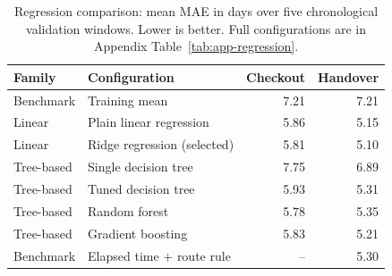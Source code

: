 \begin{table}[ht]
\centering\small
\caption{Regression comparison: mean MAE in days over five chronological validation windows. Lower is better. Full configurations are in Appendix Table~\ref{tab:app-regression}.}
\label{tab:regression-family-summary}
\begin{tabular}{@{}llrr@{}}
\toprule
Family & Configuration & Checkout & Handover \\
\midrule
Benchmark & Training mean & 7.21 & 7.21 \\
Linear & Plain linear regression & 5.86 & 5.15 \\
Linear & Ridge regression (selected) & 5.81 & 5.10 \\
Tree-based & Single decision tree & 7.75 & 6.89 \\
Tree-based & Tuned decision tree & 5.93 & 5.31 \\
Tree-based & Random forest & 5.78 & 5.35 \\
Tree-based & Gradient boosting & 5.83 & 5.21 \\
Benchmark & Elapsed time + route rule & -- & 5.30 \\
\bottomrule
\end{tabular}
\end{table}
